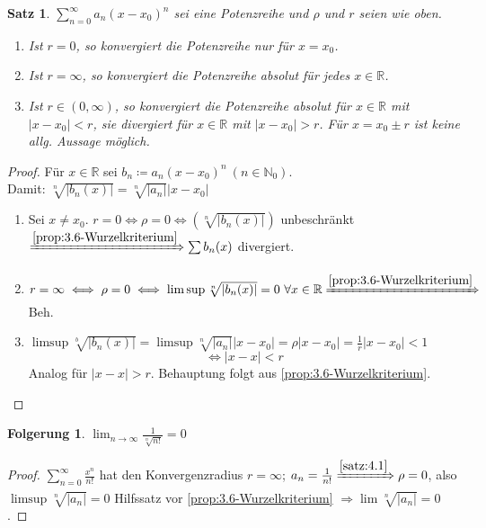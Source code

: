 \documentclass[titlepage,ngerman,a4paper,headsepline,DIV15,halfparskip*,14pt]{scrartcl}
\newcommand{\R}{\mathbb{R}}
\newcommand{\N}{\mathbb{N}}
\theoremstyle{dotless}
\newtheorem{satz}{Satz}[section]
\newtheorem*{folg*}{Folgerung}
\begin{document}
\begin{satz} \label{satz:4.1}
	$\sum_{n=0}^{\infty} a_{n} (x - x_{0})^{n}$ sei eine Potenzreihe und $\rho$ und $r$ seien wie oben.
	\begin{enumerate}
		\item Ist $r = 0$, so konvergiert die Potenzreihe nur für $x = x_{0}$.
		\item Ist $r = \infty$, so konvergiert die Potenzreihe absolut für jedes $x \in \R$.
		\item Ist $r \in (0, \infty)$, so konvergiert die Potenzreihe absolut für $x \in \R$ mit $|x - x_{0}| < r$, sie divergiert für $x \in \R$ mit $|x - x_{0}| > r$. Für $x = x_{0} \pm r$ ist keine allg. Aussage möglich.
	\end{enumerate}
\end{satz}

\begin{proof}
	Für $x \in \R$ sei $b_{n} \coloneqq a_{n} (x - x_{0})^{n} ~(n \in \N_{0})$. \\
	Damit: $\sqrt[n]{|b_{n}(x)|} = \sqrt[n]{|a_{n}|} |x - x_{0}|$
	\begin{enumerate}
		\item Sei $x \neq x_{0}$. $r = 0 \iff \rho = 0 \iff \left( \sqrt[n]{|b_{n}(x)|} \right)$ unbeschränkt $\xRightarrow[]{\ref{prop:3.6-Wurzelkriterium}} \sum b_{n}(x)$ divergiert.
		\item $r = \infty \iff \rho = 0 \iff \limsup \sqrt[n]{|b_{n}(x)|} = 0 ~\forall x \in \R \xRightarrow[]{\ref{prop:3.6-Wurzelkriterium}}$ Beh.
		\item $\limsup \sqrt[b]{|b_{n}(x)|} = \limsup \sqrt[n]{|a_{n}|} |x - x_{0}| = \rho |x - x_{0}| = \frac{1}{r} |x - x_{0}| < 1$ 
			$$ \iff |x - x| < r $$
			Analog für $|x - x| > r$. Behauptung folgt aus \ref{prop:3.6-Wurzelkriterium}.
	\end{enumerate}	
\end{proof}


\begin{folg*}
	$\lim_{n \rightarrow \infty} \frac{1}{\sqrt[n]{n!}} = 0$	
\end{folg*}

\begin{proof}
	$\sum_{n=0}^{\infty} \frac{x^{n}}{n!}$ hat den Konvergenzradius $r = \infty$; $a_{n} = \frac{1}{n!} \xRightarrow[]{\ref{satz:4.1}} \rho = 0$, also $\limsup \sqrt[n]{|a_{n}|} = 0$ Hilfssatz vor \ref{prop:3.6-Wurzelkriterium} $\Rightarrow \lim \sqrt[n]{|a_{n}|} = 0$.
\end{proof}
\end{document}
